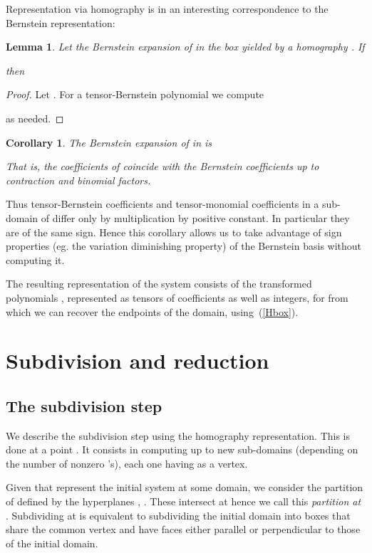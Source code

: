 \documentclass{sig-alternate}
\newtheorem{lemma}[theorem]{Lemma}
\newtheorem{corollary}[theorem]{Corollary}
\begin{document}
Representation via homography is in an interesting correspondence to
the Bernstein representation:

\begin{lemma} \label{lem:bernsteincoefs}
Let  the Bernstein expansion of  in the box  yielded by a homography . If 

then

\end{lemma}
\begin{proof}
Let . For a tensor-Bernstein polynomial  we compute

as needed.
\end{proof}

\begin{corollary}\label{cor:bernsteincoefs}
The Bernstein expansion of  in  is

That is, the coefficients of  coincide with the Bernstein
coefficients up to contraction and binomial factors.
\end{corollary}

Thus tensor-Bernstein coefficients and tensor-mo\-no\-mial
coefficients in a sub-domain of  differ only by
multiplication by positive constant. In particular they are of the
same sign. Hence this corollary allows us to take advantage of sign
properties (eg. the variation diminishing property) of the Bernstein
basis without computing it.



The resulting representation of the system consists of  the transformed
polynomials , represented as tensors of coefficients as
well as  integers,  for 
from which we can recover the endpoints of the domain, using~(\ref{Hbox}).


\section{Subdivision and reduction} \label{subdivision-reduction}

\subsection{The subdivision step}

We describe the subdivision step using the homography representation. This is
done at a point . It
consists in computing up to  new sub-domains (depending on the
number of nonzero 's), each one having  as a vertex.

Given  that represent the initial system at some
domain, we consider the partition of  defined by the
hyperplanes , . These intersect at 
hence we call this \emph{partition at }. Subdividing at  is equivalent to subdividing the
initial domain into boxes that share the common vertex  and have faces either parallel or perpendicular to those of
the initial domain.
\end{document}
